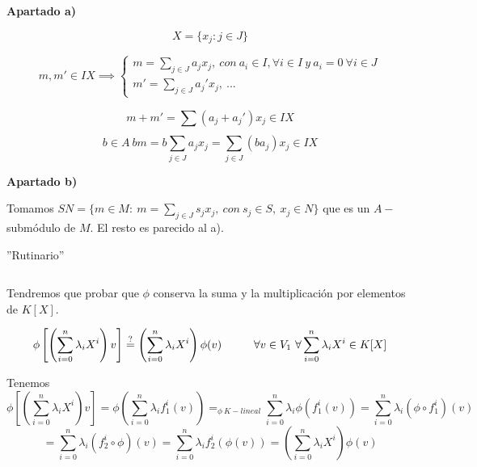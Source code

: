\documentclass[openany]{book}
\begin{document}
\begin{exercise}
    $ $

    \begin{flushright}
        \textbf{Apartado a)}
    \end{flushright}
    

    $$ X = \{x_j:j \in J\} $$

    $$ m, m' \in IX \implies \left\{
    \begin{array}{l}
        m = \sum\limits_{j \in J}^{}a_jx_j,\  con\ a_i \in I, \forall i \in I\ y\ a_i = 0\ \forall  i \in J  \\ 
        m' = \sum\limits_{j \in J}^{} a_j'x_j ,\ ...
    \end{array}
    \right. $$

    $$ m+m' = \sum\limits_{}^{} (a_j+a_j') x_j \in IX $$
    $$ b \in A\  bm = b \sum\limits_{j \in J}^{}a_jx_j = \sum\limits_{j \in J}^{}(ba_j)x_j \in IX $$

    \begin{flushright}
        \textbf{Apartado b)}
    \end{flushright}
    
    Tomamos $ SN = \{m \in M:\ m = \sum\limits_{j \in J}^{} s_jx_j,\ con\ s_j \in S,\ x_j \in N\}$ que es un $ A-$submódulo de $ M$. El resto es parecido al a).

\end{exercise}

\begin{exercise}
    ''Rutinario''
\end{exercise}

\begin{exercise}
    $ $

    Tendremos que probar que $ \phi$ conserva la suma y la multiplicación por elementos de $ K[X]$.

    $$ \phi\left[ \left( \sum\limits_{i=0}^{n}\lambda_iX^{i} \right)v\right] \stackrel{?}{=} \left( \sum\limits_{i=0}^{n}\lambda_iX^{i}  \right) \phi(v) \hspace{10mm} \forall v \in V_1\  \forall  \sum\limits_{i=0}^{n}\lambda_iX^{i} \in K[X]  $$


    Tenemos
    $$ \phi\left[ \left( \sum\limits_{i=0}^{n}\lambda_iX^{i} \right)v\right] = \phi \left( \sum\limits_{i=0}^{n}\lambda_if_{1}^{i}(v)  \right) =_{\phi\ K-lineal}\sum\limits_{i=0}^{n}\lambda_i \phi \left( f_{1}^{i}(v) \right) = \sum\limits_{i=0}^{n}\lambda_i (\phi \circ f_{1}^{i})(v)   $$
    $$ = \sum\limits_{i=0}^{n}\lambda_i (f_{2}^{i}\circ \phi)(v) = \sum\limits_{i=0}^{n}\lambda_if_{2}^{i}(\phi(v)) = \left( \sum\limits_{i=0}^{n}\lambda_iX^{i}  \right) \phi(v)   $$
\end{exercise}
\end{document}
